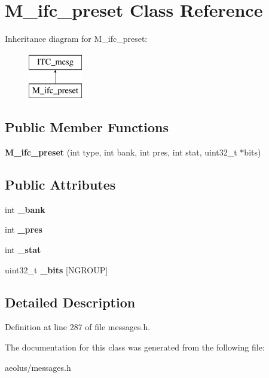 \hypertarget{class_m__ifc__preset}{}\section{M\+\_\+ifc\+\_\+preset Class Reference}
\label{class_m__ifc__preset}
Inheritance diagram for M\+\_\+ifc\+\_\+preset\+:\begin{figure}[H]
\begin{center}
\leavevmode
\includegraphics[height=2.000000cm]{class_m__ifc__preset}
\end{center}
\end{figure}
\subsection*{Public Member Functions}
\begin{DoxyCompactItemize}
\item 
\mbox{\label{class_m__ifc__preset_a2ef4b34775012702a002b977f081445b}} 
{\bfseries M\+\_\+ifc\+\_\+preset} (int type, int bank, int pres, int stat, uint32\+\_\+t $\ast$bits)
\end{DoxyCompactItemize}
\subsection*{Public Attributes}
\begin{DoxyCompactItemize}
\item 
\mbox{\label{class_m__ifc__preset_a6a897d30ca65c29dc1b62c7b68d64313}} 
int {\bfseries \+\_\+bank}
\item 
\mbox{\label{class_m__ifc__preset_aeec461a452d1c9951448665d416825fe}} 
int {\bfseries \+\_\+pres}
\item 
\mbox{\label{class_m__ifc__preset_a4e29c5c8145900310d444c11d24bdfb4}} 
int {\bfseries \+\_\+stat}
\item 
\mbox{\label{class_m__ifc__preset_aae8906af37af79c956d9bcfac4c14731}} 
uint32\+\_\+t {\bfseries \+\_\+bits} \mbox{[}N\+G\+R\+O\+UP\mbox{]}
\end{DoxyCompactItemize}


\subsection{Detailed Description}


Definition at line 287 of file messages.\+h.



The documentation for this class was generated from the following file\+:\begin{DoxyCompactItemize}
\item 
aeolus/messages.\+h\end{DoxyCompactItemize}
